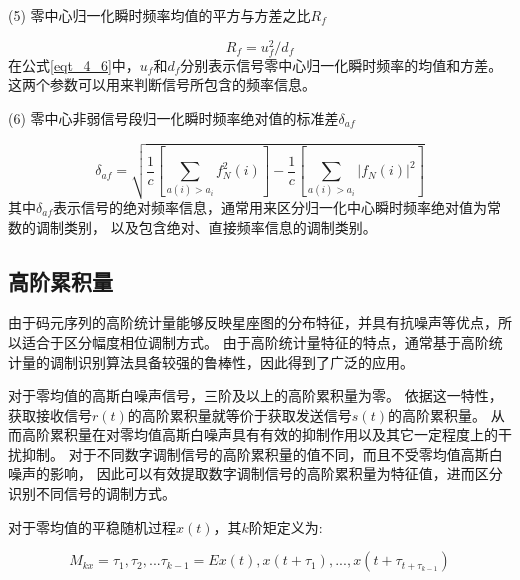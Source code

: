 (5) 零中心归一化瞬时频率均值的平方与方差之比$R_f$\par
\begin{equation}
\label{eqt_4_6}
R_f = u_f^2 / d_f
\end{equation}
在公式\ref{eqt_4_6}中，$u_f$和$d_f$分别表示信号零中心归一化瞬时频率的均值和方差。
这两个参数可以用来判断信号所包含的频率信息。\par

(6) 零中心非弱信号段归一化瞬时频率绝对值的标准差$\delta_{af}$\par
\begin{equation}
\label{eqt_4_7}
\delta_{af} = \sqrt{\frac{1}{c}\left[\sum_{a(i)>a_i} f_N^2(i)\right]
	- \frac{1}{c}\left[\sum_{a(i)>a_i} \left|f_N(i)\right|^2\right]}
\end{equation}
其中$\delta_{af}$表示信号的绝对频率信息，通常用来区分归一化中心瞬时频率绝对值为常数的调制类别，
以及包含绝对、直接频率信息的调制类别。\par

\subsection{高阶累积量}

由于码元序列的高阶统计量能够反映星座图的分布特征，并具有抗噪声等优点，所以适合于区分幅度相位调制方式。
由于高阶统计量特征的特点，通常基于高阶统计量的调制识别算法具备较强的鲁棒性，因此得到了广泛的应用\cite{张利2017基于高阶累积量的调制识别算法的研究}\cite{李世平2011基于小波和高阶累积量的数字调制识别算法}\cite{韩钢2003基于高阶累积量和支撑矢量机的调制识别研究}\cite{基于高阶累积量和循环谱的信号调制方式混合识别算法}\cite{陆凤波2008一种基于高阶累积量的数字调相信号识别方法}。\par

对于零均值的高斯白噪声信号，三阶及以上的高阶累积量为零。
依据这一特性，获取接收信号$r(t)$的高阶累积量就等价于获取发送信号$s(t)$的高阶累积量。
从而高阶累积量在对零均值高斯白噪声具有有效的抑制作用以及其它一定程度上的干扰抑制。
对于不同数字调制信号的高阶累积量的值不同，而且不受零均值高斯白噪声的影响，
因此可以有效提取数字调制信号的高阶累积量为特征值，进而区分识别不同信号的调制方式。\par

对于零均值的平稳随机过程$x(t)$，其$k$阶矩定义为:\par
\begin{equation}
\label{eqt_4_8}
M_{kx} = \tau_1, \tau_2, ... \tau_{k-1} = E{x(t), x(t+\tau_1), ..., x(t+\tau_{t+\tau_{k-1}})}
\end{equation}

